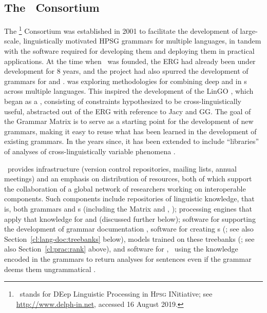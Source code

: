 \documentclass[output=paper
                ,modfonts
                ,nonflat
	        ,collection
	        ,collectionchapter
	        ,collectiontoclongg
 	        ,biblatex
                ,babelshorthands
                ,newtxmath
                ,draftmode
                ,colorlinks, citecolor=brown
]{./langsci/langscibook}
\begin{document}
\subsection{The \delphin\ Consortium}
\label{cl:delphin}


The \delphin\footnote{\delphin\ stands for DEep Linguistic
  Processing in \textsc{Hpsg} INitiative; see \url{http://www.delph-in.net}, accessed 16 August 2019.} Consortium
was established in 2001 to facilitate the development of large-scale,
linguistically motivated HPSG grammars for multiple languages, in tandem
with the software required for developing them and deploying them in
practical applications. At the time when \delphin\ was founded, the
ERG
\citep{Flickinger2000a,Flickinger2011a-u} had already been under
development for 8 years, and the  project
\citep{Wahlster2000a-ed} had also spurred the development of grammars for
 \citep[GG;][]{MK2000a-cr,Crysmann2003b} and 
\citep*[Jacy;][]{SBB2016a}. 
\citep*{Callmeier-etal:2004} was exploring methodologies for combining
deep and  in s across multiple
languages. This inspired the development of the LinGO 
\citep*{BFO2002a-u}, which began as a , consisting of
constraints hypothesized to be cross-linguistically useful, abstracted
out of the ERG with reference to Jacy and GG. The goal of the Grammar
Matrix is to serve as a starting point for the development of new
grammars, making it easy to reuse what has been learned in the
development of existing grammars. In the years since, it has been
extended to include ``libraries'' of analyses of cross-linguistically
variable phenomena \citep[e.g.,][]{Drellishak2009a-u,BDFPS2010a-u}.

\delphin\ provides infrastructure (version control repositories,
mailing lists, annual meetings) and an emphasis on 
distribution of resources, both of which support the collaboration of a
global network of researchers working on interoperable
components. Such components include repositories of linguistic knowledge, that
is, both grammars and s (including the Matrix and ,
\citealt{Fokkens:14}); processing engines that apply that
knowledge for  and  (discussed further below);
software for supporting the development of grammar documentation
\citep[e.g.,][]{Hashimoto-etal:07}, software for creating s
(\citealt{OFTM2004a-u,Packard:15}; see also Section~\ref{cl:lang-doc:treebanks} below), 
 models trained on these treebanks
(\citealt{Tou:Man:Fli:Oep:05}; see also Section~\ref{cl:prac:rank} above), and
software for , \ie\ using the knowledge encoded in
the grammars to return analyses for sentences even if the grammar
deems them ungrammatical
\citep{W11-2923,buys2017parse,chen2018parse}.
\end{document}
